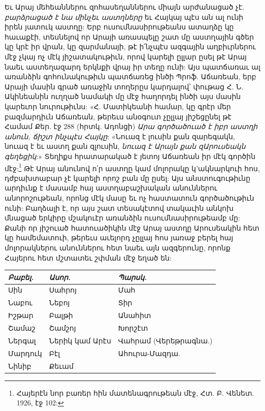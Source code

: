 \documentclass{article}
\begin{document}
{Եւ Արայ մեհեաններու զոհասեղաններու միայն արժանացած չէ. \emph{բարձրացած է նա մինչեւ աստղները} եւ Հայկայ պէս ան ալ ունի իրեն յատուկ աստղը: Երբ ուսումնասիրութեանս ատաղձը կը հաւաքէի, տեսնելով որ Արայի առասպելը շատ մը աստղային գծեր կը կրէ իր վրան, կը զարմանայի, թէ ի՛նչպէս ազգային աղբիւրներու մէջ չկայ ոչ մէկ յիշատակութիւն, որով կարելի ըլլար ըսել թէ Արայ նաեւ աստեղազարդ երկնքի վրայ իր տեղը ունի: Այս պատճառաւ ալ առանձին գոհունակութիւն պատճառեց ինծի Պրոֆ. Աճառեան, երբ Արայի մասին գրած առաջին տողերըս կարդալով՝ փութաց Հ. Ն. Ակինեանին ուղղած նամակի մը մէջ հաղորդել ինծի այս մասին կարեւոր նուրութիւնս: «Հ. Մատիկեանի համար, կը գրէր մեր բազմարդիւն Աճառեան, թերեւս անօգուտ չըլլայ յիշեցընել թէ Համամ Քեր. էջ 288 (հրտկ. Ադոնցի) \emph{Արա գործածուած է իբր աստղի անուն, ճիշտ ինչպէս Հայկը}: «Նուազ է լուսին քան զարեգակն, նուազ է եւ աստղ քան զլուսին, \emph{նուազ է Արայն քան զԱրուսեակն գեղեցիկ}:» Տեղիքս հրատարակած է յետոյ Աճառեան իր մէկ գործին մէջ:\footnote{Հայերէն նոր բառեր հին մատենագրութեան մէջ, Հտ. Բ. Վենետ. 1926, էջ 102:} Թէ Արայ անունով ո՛ր աստղը կամ մոլորակը կ'ակնարկուի հոս, դժբախտաբար չէ կարելի որոշ բան մը ըսել: Այս անստուգութիւնը արդիւնք է մասամբ հայ աստղաբաշխական անուններու անորոշութեան, որոնց մէկ մասը եւ ոչ հաստատուն գործածութիւն ունի: Բաղձալի է, որ այս շատ տեսակէտով տակաւին անկոխ մնացած երկիրը մշակուէր առանձին ուսումնասիրութեամբ մը: Քանի որ յիշուած հատուածիկին մէջ Արայ աստղը Արուսեակին հետ կը համեմատուի, թերեւս աւելորդ չըլլայ հոս յառաջ բերել հայ մոլորակներու անուններու հետ նաեւ այն ազգերունը, որոնք Հայերու հետ մշտատեւ շփման մէջ եղած են:}

\begin{table}[H]
    \centering
    \arm
    \normalsize
    \begin{tabular}{l l l}
        \emph{Բաբել.}  &  \emph{Ասոր.}         &  \emph{Պարսկ.}              \\ \hline
         Սին       &  Սահրոյ          &  Մահ                   \\
         Նաբու     &  Նեբոյ           &  Տիր                   \\ 
         Իշթար     &  Բալթի           &  Անահիտ                \\ 
         Շամաշ     &  Շամշոյ          &  Խորշէտ                \\
         Ներգալ    &  Ներիկ կամ Արէս  &  Վահրամ (Վերեթրագնա.)  \\ 
         Մարդուկ   &  Բէլ             &  Ահուրա-Մազդա.         \\
         Նինիբ     &  Քեւամ           & ~ \\
    \end{tabular}
\end{table}
\end{document}
